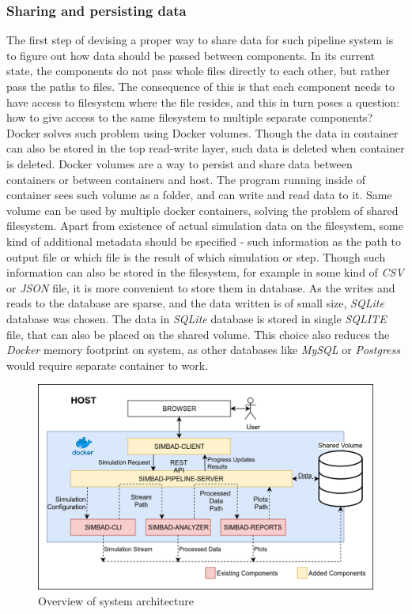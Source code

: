 \subsubsection{Sharing and persisting data}
The first step of devising a proper way to share data for such pipeline system is to figure out how data should be passed between components. In its current state, the components do not pass whole files directly to each other, but rather pass the paths to files. The consequence of this is that each component needs to have access to filesystem where the file resides, and this in turn poses a question: how to give access to the same filesystem to multiple separate components? Docker solves such problem using Docker volumes.  Though the data in container can also be stored in the top read-write layer, such data is deleted when container is deleted. Docker volumes are a way to persist and share data between containers or between containers and host. The program running inside of container sees such volume as a folder, and can write and read data to it. Same volume can be used by multiple docker containers, solving the problem of shared filesystem. Apart from existence of actual simulation data on the filesystem, some kind of additional metadata should be specified - such information as the path to output file or which file is the result of which simulation or step. Though such information can also be stored in the filesystem, for example in some kind of \textit{CSV} or \textit{JSON} file, it is more convenient to store them in database. As the writes and reads to the database are sparse, and the data written is of small size, \textit{SQLite} database was chosen. The data in \textit{SQLite} database is stored in single \textit{SQLITE} file, that can also be placed on the shared volume. This choice also reduces the \textit{Docker} memory footprint on system, as other databases like \textit{MySQL} or \textit{Postgress} would require separate container to work.
\begin{figure}[h!]
	\centering
		\includegraphics[width=0.9\linewidth]{diagrams/arch4.png}
	\caption{Overview of system architecture}
	\label{fig:arch4}
\end{figure}
